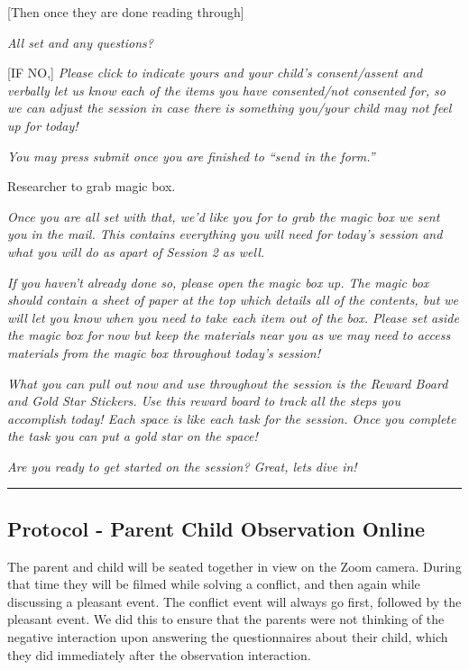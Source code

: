 \documentclass[]{book}
\begin{document}
{[}Then once they are done reading through{]}

\emph{All set and any questions?}

{[}IF NO,{]} \emph{Please click to indicate yours and your child's consent/assent and verbally let us know each of the items you have consented/not consented for, so we can adjust the session in case there is something you/your child may not feel up for today!}

\emph{You may press submit once you are finished to ``send in the form.''}

Researcher to grab magic box.

\emph{Once you are all set with that, we'd like you for to grab the magic box we sent you in the mail. This contains everything you will need for today's session and what you will do as apart of Session 2 as well.}

\emph{If you haven't already done so, please open the magic box up. The magic box should contain a sheet of paper at the top which details all of the contents, but we will let you know when you need to take each item out of the box. Please set aside the magic box for now but keep the materials near you as we may need to access materials from the magic box throughout today's session!}

\emph{What you can pull out now and use throughout the session is the Reward Board and Gold Star Stickers. Use this reward board to track all the steps you accomplish today! Each space is like each task for the session. Once you complete the task you can put a gold star on the space!}

\emph{Are you ready to get started on the session? Great, lets dive in!}

\begin{center}\rule{0.5\linewidth}{0.5pt}\end{center}

\hypertarget{protocol---parent-child-observation-online}{%
\subsection{Protocol - Parent Child Observation Online}\label{protocol---parent-child-observation-online}}

The parent and child will be seated together in view on the Zoom camera. During that time they will be filmed while solving a conflict, and then again while discussing a pleasant event. The conflict event will always go first, followed by the pleasant event. We did this to ensure that the parents were not thinking of the negative interaction upon answering the questionnaires about their child, which they did immediately after the observation interaction.
\end{document}
